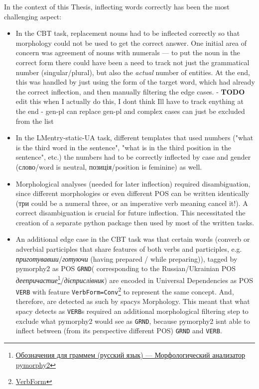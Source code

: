 In the context of this Thesis, inflecting words correctly has been the
most challenging aspect:

\begin{itemize}
\tightlist
\item
  In the CBT task, replacement nouns had to be inflected correctly so
  that morphology could not be used to get the correct answer. One
  initial area of concern was agreement of nouns with numerals --- to
  put the noun in the correct form there could have been a need to track
  not just the grammatical number (singular/plural), but also the
  \emph{actual} number of entities. At the end, this was handled by just
  using the form of the target word, which had already the correct
  inflection, and then manually filtering the edge cases. -
  \textbf{TODO} edit this when I actually do this, I
  don\textquotesingle t think I\textquotesingle ll have to track
  enything at the end - gen-pl can replace gen-pl and complex cases can
  just be excluded from the list
\item
  In the LMentry-static-UA task, different templates that used numbers
  ("what is the third word in the sentence", "what is in the third
  position in the sentence", etc.) the numbers had to be correctly
  inflected by case and gender
  (слово/\textquotesingle word\textquotesingle{} is neutral,
  позиція/\textquotesingle position\textquotesingle{} is feminine) as
  well.
\item
  Morphological analyses (needed for later inflection) required
  disambiguation, since different morphologies or even different POS can
  be written identically (\textquotesingle три\textquotesingle{} could
  be a numeral three, or an imperative verb meaning
  \textquotesingle cancel it!\textquotesingle). A correct disambiguation
  is crucial for future inflection. This necessitated the creation of a
  separate python package then used by most of the written tasks.
\item
  An additional edge case in the CBT task was that certain words
  (\textquotesingle converb\textquotesingle{} or
  \textquotesingle adverbial participles\textquotesingle{} that share
  features of both verbs and participles, e.g.
  \emph{приготувавши}/\emph{готуючи} (\textquotesingle having
  prepared\textquotesingle{} / \textquotesingle while
  preparing\textquotesingle)), tagged by pymorphy2 as POS \texttt{GRND}(
  corresponding to the Russian/Ukrainian POS
  \emph{деепричастие}\footnote{\href{https://pymorphy2.readthedocs.io/en/stable/user/grammemes.html}{Обозначения
    для граммем (русский язык) --- Морфологический анализатор pymorphy2}}/\emph{дієприслівник})
  are encoded in Universal Dependencies as POS \texttt{VERB} with
  feature \texttt{VerbForm=Conv}\footnote{\href{https://universaldependencies.org/u/feat/VerbForm.html}{VerbForm}}
  to represent the same concept. And, therefore, are detected as such by
  spacy\textquotesingle s Morphology. This meant that what spacy detects
  as \texttt{VERB}s required an additional morphological filtering step
  to exclude what pymorphy2 would see as \texttt{GRND}, because
  pymorphy2 isn\textquotesingle t able to inflect between (from its
  perspective different POS) \texttt{GRND} and \texttt{VERB}.
\end{itemize}

